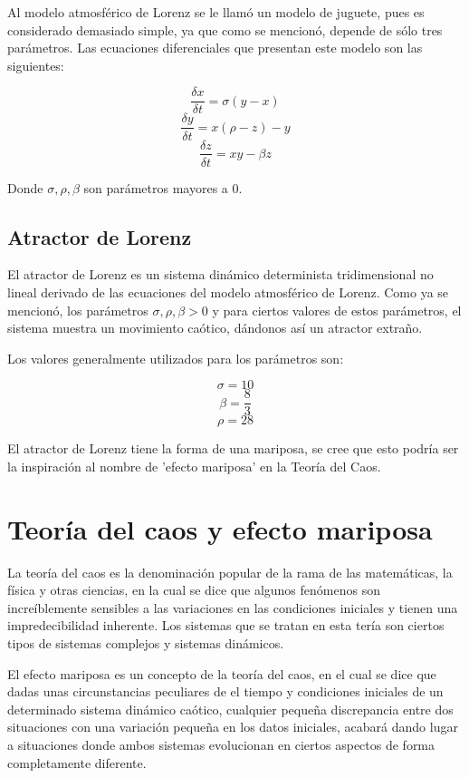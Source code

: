 \documentclass[12pt]{article}
\begin{document}
\begin{doublespace}
Al modelo atmosférico de Lorenz se le llamó un modelo de juguete, pues es considerado demasiado simple, ya que como se mencionó, depende de sólo tres parámetros. Las ecuaciones diferenciales que presentan este modelo son las siguientes: 


$$\frac{\delta x}{\delta t} = \sigma \left( y- x \right)$$
$$\frac{\delta y}{\delta t} = x \left( \rho- z \right) -y$$
$$\frac{\delta z}{\delta t} = xy - \beta z$$

Donde $\sigma, \rho, \beta$ son parámetros mayores a 0.

\subsection{Atractor de Lorenz}

El atractor de Lorenz es un sistema dinámico determinista tridimensional no lineal derivado de las ecuaciones del modelo atmosférico de Lorenz. Como ya se mencionó, los parámetros  $\sigma, \rho, \beta > 0$ y para ciertos valores de estos parámetros, el sistema muestra un movimiento caótico, dándonos así un atractor extraño. 

Los valores generalmente utilizados para los parámetros son:

$$\sigma = 10$$
$$\beta  = \frac{8}{3}$$
$$\rho  = 28$$ 

El atractor de Lorenz tiene la forma de una mariposa, se cree que esto podría ser la inspiración al nombre de 'efecto mariposa' en la Teoría del Caos.

\section{Teoría del caos y efecto mariposa}
La teoría del caos es la denominación popular de la rama de las matemáticas, la física y otras ciencias, en la cual se dice que algunos fenómenos son increíblemente sensibles a las variaciones en las condiciones iniciales y tienen una impredecibilidad inherente. Los sistemas que se tratan en esta tería son ciertos tipos de sistemas complejos y sistemas dinámicos.

El efecto mariposa es un concepto de la teoría del caos, en el cual se dice que dadas unas circunstancias peculiares de el tiempo y condiciones iniciales de un determinado sistema dinámico caótico, cualquier pequeña discrepancia entre dos situaciones con una variación pequeña en los datos iniciales, acabará dando lugar a situaciones donde ambos sistemas evolucionan en ciertos aspectos de forma completamente diferente.


\end{doublespace}
\end{document}
